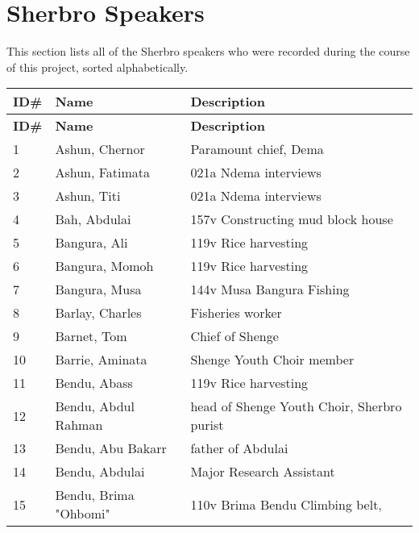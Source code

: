 \chapter{Sherbro Speakers}
\label{app:f}

This section lists all of the Sherbro speakers who were recorded during the course of this project, sorted alphabetically.


\begin{xltabular}{\textwidth}{llQ}
\lsptoprule
		\textbf{ID\#} & \textbf{Name} & \textbf{Description}\\
		\midrule\endfirsthead
    \midrule
    \textbf{ID\#} & \textbf{Name} & \textbf{Description}\\
		\midrule\endhead
  \midrule\endfoot
    \lspbottomrule
    \endlastfoot
    
 1 & Ashun, Chernor & Paramount chief, Dema\\
 2 & Ashun, Fatimata & 021a Ndema interviews\\
 3 & Ashun, Titi & 021a Ndema interviews\\
 4 & Bah, Abdulai & 157v Constructing mud block house\\
 5 & Bangura, Ali & 119v Rice harvesting\\
 6 & Bangura, Momoh & 119v Rice harvesting\\
 7 & Bangura, Musa & 144v Musa Bangura Fishing\\
 8 & Barlay, Charles & Fisheries worker\\
 9 & Barnet, Tom & Chief of Shenge\\
 10 & Barrie, Aminata & Shenge Youth Choir member\\
 11 & Bendu, Abass & 119v Rice harvesting\\
 12 & Bendu, Abdul Rahman & head of Shenge Youth Choir, Sherbro purist\\
 13 & Bendu, Abu Bakarr & father of Abdulai\\
 14 & Bendu, Abdulai & Major Research Assistant\\
 15 & Bendu, Brima "Ohbomi" & 110v Brima Bendu Climbing belt,


\end{xltabular}
